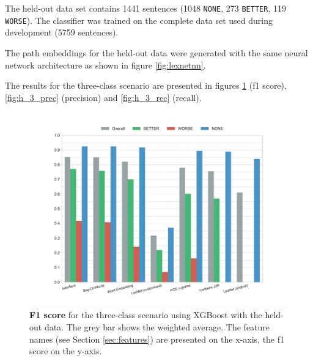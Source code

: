The held-out data set contains 1441 sentences (1048 \texttt{NONE}, 273 \texttt{BETTER}, 119 \texttt{WORSE}). The classifier was trained on the complete data set used during development (5759 sentences).

The path embeddings for the held-out data were generated with the same neural network architecture as shown in figure \ref{fig:lexnetnn}.

The results for the three-class scenario are presented in figures \ref{fig:h_3_f1} (f1 score), \ref{fig:h_3_prec} (precision) and \ref{fig:h_3_rec} (recall).


\begin{figure}[htbp]
         \caption{\textbf{F1 score} for the three-class scenario using XGBoost with the held-out data. The grey bar shows the weighted average. The feature names (see Section \ref{sec:features}) are presented on the x-axis, the f1 score on the y-axis.} 
    \label{fig:h_3_f1}
    \centering
	\includegraphics[width=1\linewidth]{images/heldout/h-f1-False}
    \end{figure}
    


